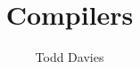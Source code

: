 \newcommand{\coursename}{Compilers}
\newcommand{\coursecode}{COMP36512}
\newcommand{\courseinfo}{}
\newcommand{\Author}{Todd Davies} 
\newcommand{\Title}{Compilers}
\author{\Author}
\title{\Title}
